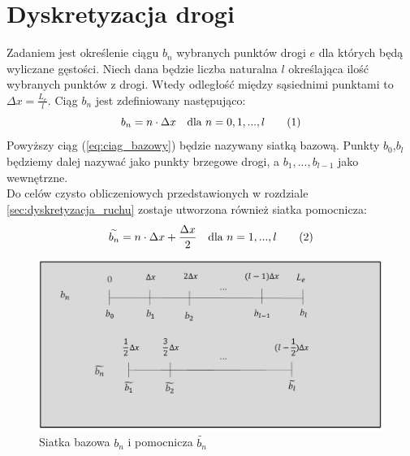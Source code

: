 \documentclass[12pt]{book}
\newcommand\addtag{\refstepcounter{equation}\tag{\theequation}}
\begin{document}
\section{Dyskretyzacja drogi}
Zadaniem jest określenie ciągu $b_n$ wybranych punktów drogi $e$ dla których będą wyliczane gęstości. Niech dana będzie liczba naturalna $l$ określająca ilość wybranych punktów z drogi. Wtedy odległość między sąsiednimi punktami to $\Delta x=\frac{L_e}{l}$. 
Ciąg $b_n$ jest zdefiniowany następująco: 
\[b_n=n\cdot \Delta x \quad \text{dla }n=0,1,...,l \addtag \label{eq:ciag_bazowy} \]
Powyższy ciąg (\ref{eq:ciag_bazowy}) będzie nazywany siatką bazową. Punkty $b_0$,$b_l$ będziemy dalej nazywać jako punkty brzegowe drogi, a $b_1,...,b_{l-1}$ jako wewnętrzne.\\
Do celów czysto obliczeniowych przedstawionych w rozdziale \ref{sec:dyskretyzacja_ruchu} zostaje utworzona również siatka pomocnicza:
\[\widetilde{b_n}=n\cdot \Delta x+\frac{\Delta x}{2} \quad \text{dla }n=1,...,l \addtag\]

\begin{figure}[H]
  \centering
    \includegraphics[width=14cm]{odcinki-2}
 \caption{Siatka bazowa $b_n$ i pomocnicza $\widetilde{b_n}$}
 \label{fig:siatka}
\end{figure}
\end{document}

